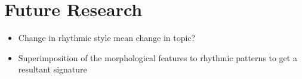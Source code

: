 \chapter{Future Research}\label{ch:future_research}
\begin{itemize}
    \item Change in rhythmic style mean change in topic?
    \item Superimposition of the morphological features to rhythmic patterns to get a resultant signature
\end{itemize}